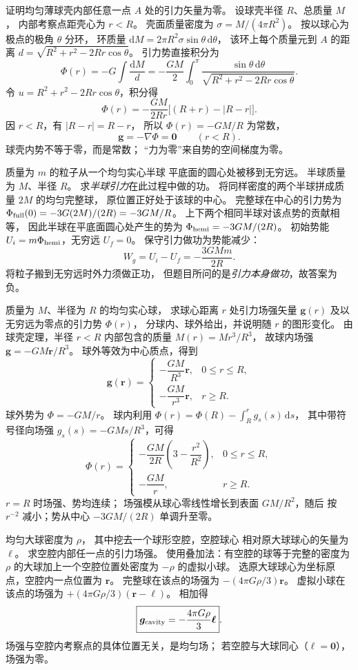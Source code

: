 证明均匀薄球壳内部任意一点 $A$ 处的引力矢量为零。
\exsolution
设球壳半径 $R$、总质量 $M$，
内部考察点距壳心为 $r<R$。
壳面质量密度为 $\sigma=M/(4\pi R^2)$。
按以球心为极点的极角 $\theta$ 分环，
环质量
$\mathrm dM=2\pi R^2\sigma\sin\theta\,\mathrm d\theta$，
该环上每个质量元到 $A$ 的距离
$d=\sqrt{R^2+r^2-2Rr\cos\theta}$。
引力势直接积分为
\[
\Phi(r)=-G\int\frac{\mathrm dM}{d}
=-\frac{GM}{2}\int_0^\pi
\frac{\sin\theta\,\mathrm d\theta}
{\sqrt{R^2+r^2-2Rr\cos\theta}}.
\]
令 $u=R^2+r^2-2Rr\cos\theta$，积分得
\[
\Phi(r)=-\frac{GM}{2Rr}
\bigl[(R+r)-|R-r|\bigr].
\]
因 $r<R$，有 $|R-r|=R-r$，
所以 $\Phi(r)=-GM/R$ 为常数，
\[
\boxed{\bm g=-\nabla\Phi=\bm0\qquad(r<R)}.
\]
\excheck 球壳内势不等于零，而是常数；
“力为零”来自势的空间梯度为零。

质量为 $m$ 的粒子从一个均匀实心半球
平底面的圆心处被移到无穷远。
半球质量为 $M$、半径 $R$。
求\emph{半球引力}在此过程中做的功。
\exsolution
将同样密度的两个半球拼成质量 $2M$ 的均匀完整球，
原位置正好处于该球的中心。
完整球在中心的引力势为
$\Phi_{\rm full}(0)=-3G(2M)/(2R)=-3GM/R$。
上下两个相同半球对该点势的贡献相等，
因此半球在平底面圆心处产生的势为
$\Phi_{\rm hemi}=-3GM/(2R)$。
初始势能 $U_i=m\Phi_{\rm hemi}$，无穷远 $U_f=0$。
保守引力做功为势能减少：
\[
\boxed{W_g=U_i-U_f=-\frac{3GMm}{2R}}.
\]
\excheck 将粒子搬到无穷远时外力须做正功，
但题目所问的是\emph{引力本身做功}，故答案为负。

质量为 $M$、半径为 $R$ 的均匀实心球，
求球心距离 $r$ 处引力场强矢量 $\bm g(r)$
及以无穷远为零点的引力势 $\Phi(r)$，
分球内、球外给出，并说明随 $r$ 的图形变化。
\exsolution
由球壳定理，半径 $r<R$ 内部包含的质量
$M(r)=M r^3/R^3$，
故球内场强
$\bm g=-GM\bm r/R^3$。
球外等效为中心质点，得到
\[
\boxed{\bm g(\bm r)=
\begin{cases}
-\dfrac{GM}{R^3}\bm r,&0\le r\le R,\\[4pt]
-\dfrac{GM}{r^3}\bm r,&r\ge R .
\end{cases}}
\]
球外势为 $\Phi=-GM/r$。
球内利用
$\Phi(r)=\Phi(R)-\int_R^r g_s(s)\,\mathrm ds$，
其中带符号径向场强 $g_s(s)=-GMs/R^3$，可得
\[
\boxed{\Phi(r)=
\begin{cases}
-\dfrac{GM}{2R}\left(3-\dfrac{r^2}{R^2}\right),
 &0\le r\le R,\\[4pt]
-\dfrac{GM}{r},&r\ge R .
\end{cases}}
\]
\excheck $r=R$ 时场强、势均连续；
场强模从球心零线性增长到表面 $GM/R^2$，随后
按 $r^{-2}$ 减小；势从中心 $-3GM/(2R)$ 单调升至零。

均匀大球密度为 $\rho$，
其中挖去一个球形空腔，空腔球心
相对原大球球心的矢量为 $\bm \ell$。
求空腔内部任一点的引力场强。
\exsolution
使用叠加法：有空腔的球等于完整的密度为 $\rho$
的大球加上一个空腔位置处密度为 $-\rho$ 的虚拟小球。
选原大球球心为坐标原点，空腔内一点位置为 $\bm r$。
完整球在该点的场强为
$-(4\pi G\rho/3)\bm r$。
虚拟小球在该点的场强为
$+(4\pi G\rho/3)(\bm r-\bm\ell)$。
相加得
\[
\boxed{\bm g_{\rm cavity}=-\frac{4\pi G\rho}{3}\bm\ell}.
\]
\excheck 场强与空腔内考察点的具体位置无关，是均匀场；
若空腔与大球同心（$\bm\ell=\bm0$），场强为零。

